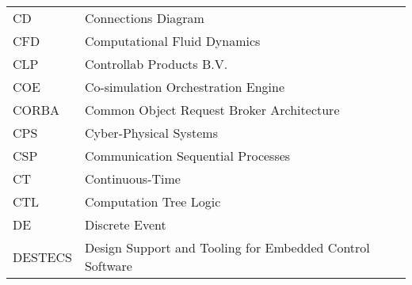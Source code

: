 \begin{longtable}{ll}
CD & Connections Diagram \\
CFD & Computational Fluid Dynamics\\
CLP	&Controllab Products B.V. \\
COE & Co-simulation Orchestration Engine \\
CORBA & Common Object Request Broker Architecture \\
CPS     & Cyber-Physical Systems\\
CSP	&Communication Sequential Processes\\
CT	&Continuous-Time\\
CTL & Computation Tree Logic \\
DE      &Discrete Event\\
DESTECS	&Design Support and Tooling for Embedded Control Software\\

\end{longtable}
